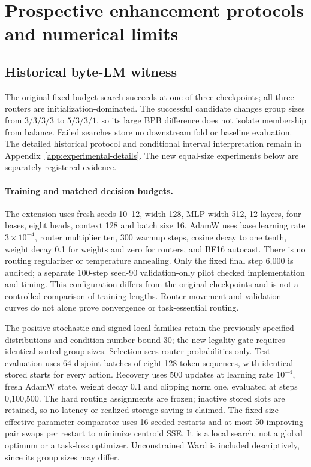 \section{Prospective enhancement protocols and numerical limits}
\label{app:enhancement-experiments}

\subsection{Historical byte-LM witness}
\label{app:historical-fold-witness}



The original fixed-budget search succeeds at one of three checkpoints;
all three routers are initialization-dominated. The successful candidate
changes group sizes from $3/3/3/3$ to $5/3/3/1$, so its large BPB difference
does not isolate membership from balance. Failed searches store no downstream
fold or baseline evaluation. The detailed historical protocol and conditional
interval interpretation remain in Appendix~\ref{app:experimental-details}.
The new equal-size experiments below are separately registered evidence.

\paragraph{Training and matched decision budgets.}
The extension uses fresh seeds 10--12, width 128, MLP width 512, 12 layers,
four bases, eight heads, context 128 and batch size 16. AdamW uses base
learning rate $3\times10^{-4}$, router multiplier ten, 300 warmup steps,
cosine decay to one tenth, weight decay 0.1 for weights and zero for routers,
and BF16 autocast. There is no routing regularizer or temperature annealing.
Only the fixed final step 6,000 is audited; a separate 100-step seed-90
validation-only pilot checked implementation and timing. This configuration
differs from the original checkpoints and is not a controlled comparison of
training lengths. Router movement and validation curves do not alone prove
convergence or task-essential routing.

The positive-stochastic and signed-local families retain the previously
specified distributions and condition-number bound 30; the new legality gate
requires identical sorted group sizes. Selection sees router probabilities
only. Test evaluation uses 64 disjoint batches of eight 128-token sequences,
with identical stored starts for every action. Recovery uses 500 updates at
learning rate $10^{-4}$, fresh AdamW state, weight decay 0.1 and clipping norm
one, evaluated at steps 0,100,500. The hard routing assignments are frozen;
inactive stored slots are retained, so no latency or realized storage saving
is claimed. The fixed-size effective-parameter comparator uses 16 seeded
restarts and at most 50 improving pair swaps per restart to minimize centroid
SSE. It is a local search, not a global optimum or a task-loss optimizer.
Unconstrained Ward is included descriptively, since its group sizes may differ.

